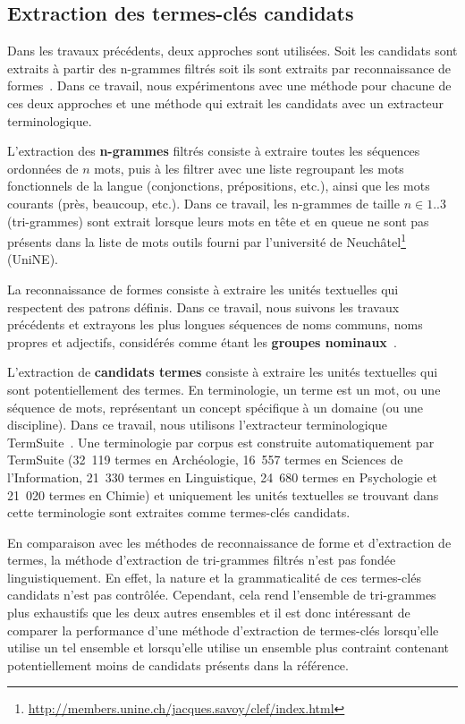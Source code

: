   \subsection{Extraction des termes-clés candidats}
  \label{subsec:extraction_de_termes_cles_candidats}
    Dans les travaux précédents, deux approches sont utilisées. Soit les
    candidats sont extraits à partir des n-grammes filtrés soit ils sont
    extraits par reconnaissance de formes~\cite{hulth2003keywordextraction}.
    Dans ce travail, nous expérimentons avec une méthode pour chacune de ces
    deux approches et une méthode qui extrait les candidats avec un extracteur
    terminologique.

    L'extraction des \textbf{n-grammes} filtrés consiste à extraire toutes les
    séquences ordonnées de $n$ mots, puis à les filtrer avec une liste
    regroupant les mots fonctionnels de la langue (conjonctions, prépositions,
    etc.), ainsi que les mots courants (\og{}près\fg{}, \og{}beaucoup\fg{},
    etc.). Dans ce travail, les n-grammes de taille $n \in {1..3}$ (tri-grammes)
    sont extrait lorsque leurs mots en tête et en queue ne sont pas présents
    dans la liste de mots outils fourni par l'université de
    Neuchâtel\footnote{\url{http://members.unine.ch/jacques.savoy/clef/index.html}}
    (UniNE).

    La reconnaissance de formes consiste à extraire les unités textuelles qui
    respectent des patrons définis. Dans ce travail, nous suivons les travaux
    précédents et extrayons les plus longues séquences de noms communs, noms
    propres et adjectifs, considérés comme étant les \textbf{groupes
    nominaux}~\cite{hassan2010conundrums}.

    L'extraction de \textbf{candidats termes} consiste à extraire les unités
    textuelles qui sont potentiellement des termes. En terminologie, un terme
    est un mot, ou une séquence de mots, représentant un concept spécifique à un
    domaine (ou une discipline). Dans ce travail, nous utilisons l'extracteur
    terminologique TermSuite~\cite{rocheteau2011termsuite}. Une terminologie par
    corpus est construite automatiquement par TermSuite (32~119 termes en
    Archéologie, 16~557 termes en Sciences de l'Information, 21~330 termes en
    Linguistique, 24~680 termes en Psychologie et 21~020 termes en Chimie) et
    uniquement les unités textuelles se trouvant dans cette terminologie sont
    extraites comme termes-clés candidats.
    
    En comparaison avec les méthodes de reconnaissance de forme et d'extraction
    de termes, la méthode d'extraction de tri-grammes filtrés n'est pas fondée
    linguistiquement. En effet, la nature et la grammaticalité de ces
    termes-clés candidats n'est pas contrôlée. Cependant, cela rend l'ensemble
    de tri-grammes plus exhaustifs que les deux autres ensembles et il est donc
    intéressant de comparer la performance d'une méthode d'extraction de
    termes-clés lorsqu'elle utilise un tel ensemble et lorsqu'elle utilise un
    ensemble plus contraint contenant potentiellement moins de candidats
    présents dans la référence.

